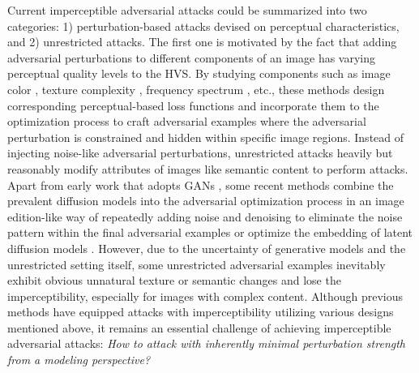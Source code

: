 \documentclass{article}
\begin{document}
Current imperceptible adversarial attacks could be summarized into two categories: 1) {perturbation-based} attacks devised on perceptual characteristics, and 2) unrestricted attacks. 
The first one is motivated by the fact that adding adversarial perturbations to different components of an image has varying perceptual quality levels to the HVS. By studying components such as image color \cite{zhao2020towards}, texture complexity \cite{duan2021advdrop}, frequency spectrum \cite{jia2022exploring, luo2022frequency}, etc., these methods design corresponding perceptual-based loss functions and incorporate them to the optimization process to craft adversarial examples where the adversarial perturbation is constrained and hidden within specific image regions.
Instead of injecting noise-like adversarial perturbations, unrestricted attacks heavily but reasonably modify attributes of images like semantic content to perform attacks. Apart from early work that adopts GANs \cite{song2018constructing}, some recent methods combine the prevalent diffusion models \cite{ho2020denoising, song2020denoising, rombach2022high} into the adversarial optimization process in an image edition-like way of repeatedly adding noise and denoising to eliminate the noise pattern within the final adversarial examples \cite{chen2023advdiffuser, xue2023diffusion} or optimize the embedding of latent diffusion models \cite{chen2023diffusion, chen2024content}. However, due to the uncertainty of generative models and the unrestricted setting itself, some unrestricted adversarial examples inevitably exhibit obvious unnatural texture or semantic changes and lose the imperceptibility, especially for images with complex content. Although previous methods have equipped attacks with imperceptibility utilizing various designs mentioned above, it remains an essential challenge of achieving imperceptible adversarial attacks: \textit{How to attack with inherently {minimal perturbation strength} from a modeling perspective?}
\end{document}
